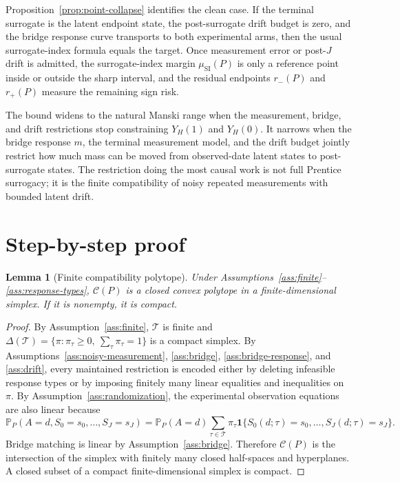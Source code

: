 \documentclass[11pt]{article}
\renewcommand{\Pr}{\mathbb{P}}
\newcommand{\one}{\mathbf{1}}
\theoremstyle{definition}
\theoremstyle{plain}
\newtheorem{lemma}{Lemma}
\theoremstyle{remark}
\begin{document}
Proposition~\ref{prop:point-collapse} identifies the clean case.  If the terminal surrogate is the latent endpoint state, the post-surrogate drift budget is zero, and the bridge response curve transports to both experimental arms, then the usual surrogate-index formula equals the target.  Once measurement error or post-\(J\) drift is admitted, the surrogate-index margin \(\mu_{\mathrm{SI}}(P)\) is only a reference point inside or outside the sharp interval, and the residual endpoints \(r_-(P)\) and \(r_+(P)\) measure the remaining sign risk.

The bound widens to the natural Manski range when the measurement, bridge, and drift restrictions stop constraining \(Y_H(1)\) and \(Y_H(0)\).  It narrows when the bridge response \(m\), the terminal measurement model, and the drift budget jointly restrict how much mass can be moved from observed-date latent states to post-surrogate states.  The restriction doing the most causal work is not full Prentice surrogacy; it is the finite compatibility of noisy repeated measurements with bounded latent drift.

\section{Step-by-step proof}
\begin{lemma}[Finite compatibility polytope]\label{lem:polytope}
Under Assumptions~\ref{ass:finite}--\ref{ass:response-types}, \(\mathcal C(P)\) is a closed convex polytope in a finite-dimensional simplex.  If it is nonempty, it is compact.
\end{lemma}

\begin{proof}
By Assumption~\ref{ass:finite}, \(\mathcal T\) is finite and \(\Delta(\mathcal T)=\{\pi:\pi_\tau\ge0,\ \sum_\tau\pi_\tau=1\}\) is a compact simplex.  By Assumptions~\ref{ass:noisy-measurement}, \ref{ass:bridge}, \ref{ass:bridge-response}, and \ref{ass:drift}, every maintained restriction is encoded either by deleting infeasible response types or by imposing finitely many linear equalities and inequalities on \(\pi\).  By Assumption~\ref{ass:randomization}, the experimental observation equations are also linear because
\[
  \Pr_P(A=d,S_0=s_0,\ldots,S_J=s_J)
  =
  \Pr_P(A=d)
  \sum_{\tau\in\mathcal T}\pi_\tau
  \one\{S_0(d;\tau)=s_0,\ldots,S_J(d;\tau)=s_J\}.
\]
Bridge matching is linear by Assumption~\ref{ass:bridge}.  Therefore \(\mathcal C(P)\) is the intersection of the simplex with finitely many closed half-spaces and hyperplanes.  A closed subset of a compact finite-dimensional simplex is compact.
\end{proof}
\end{document}
